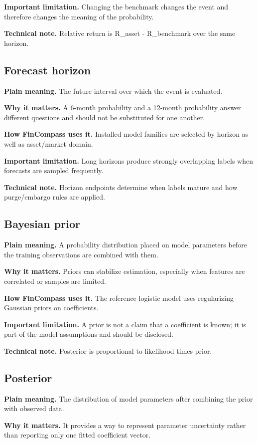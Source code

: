 \documentclass[11pt]{article}
\begin{document}
\textbf{Important limitation.} Changing the benchmark changes the event and therefore changes the meaning of the probability.

\textbf{Technical note.} Relative return is R\_asset - R\_benchmark over the same horizon.

\subsection{Forecast horizon}
\textbf{Plain meaning.} The future interval over which the event is evaluated.

\textbf{Why it matters.} A 6-month probability and a 12-month probability answer different questions and should not be substituted for one another.

\textbf{How FinCompass uses it.} Installed model families are selected by horizon as well as asset/market domain.

\textbf{Important limitation.} Long horizons produce strongly overlapping labels when forecasts are sampled frequently.

\textbf{Technical note.} Horizon endpoints determine when labels mature and how purge/embargo rules are applied.

\subsection{Bayesian prior}
\textbf{Plain meaning.} A probability distribution placed on model parameters before the training observations are combined with them.

\textbf{Why it matters.} Priors can stabilize estimation, especially when features are correlated or samples are limited.

\textbf{How FinCompass uses it.} The reference logistic model uses regularizing Gaussian priors on coefficients.

\textbf{Important limitation.} A prior is not a claim that a coefficient is known; it is part of the model assumptions and should be disclosed.

\textbf{Technical note.} Posterior is proportional to likelihood times prior.

\subsection{Posterior}
\textbf{Plain meaning.} The distribution of model parameters after combining the prior with observed data.

\textbf{Why it matters.} It provides a way to represent parameter uncertainty rather than reporting only one fitted coefficient vector.
\end{document}
